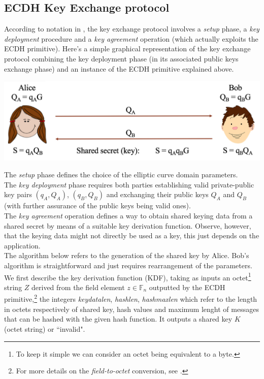 \subsection{ECDH Key Exchange protocol}
According to notation in \cite{Sec}, the key exchange protocol involves a \textit{setup} phase, a \textit{key deployment} procedure and a \textit{key agreement} operation (which actually exploits the ECDH primitive).
Here's a simple graphical representation of the key exchange protocol combining the key deployment phase (in its associated public keys exchange phase) and an instance of the ECDH primitive explained above.
\begin{center}
	\includegraphics[scale = 0.55]{Images/ECDH.png}
	\label{fig:ECDH}
\end{center}
The \textit{setup} phase defines the choice of the elliptic curve domain parameters.\\
The \textit{key deployment} phase requires both parties establishing valid private-public key pairs $(q_A,Q_A)$, $(q_B,Q_B)$ and exchanging their public keys $Q_A$ and $Q_B$ (with further assurance of the public keys being valid ones).\\
The \textit{key agreement} operation defines a way to obtain shared keying data from a shared secret by means of a suitable key derivation function. Observe, however, that the keying data might not directly be used as a key, this just depends on the application.\\ The algorithm below refers to the generation of the shared key by Alice. Bob's algorithm is straightforward and just requires rearrangement of the parameters. We first describe the key derivation function (KDF), taking as inputs an octet\footnote{To keep it simple we can consider an octet being equivalent to a byte.} string $Z$ derived from the field element $z \in \mathbb{F}_n$ outputted by the ECDH primitive,\footnote{For more details on the \textit{field-to-octet} conversion, see \cite{Sec}.} the integers \textit{keydatalen}, \textit{hashlen}, \textit{hashmaxlen} which refer to the length in octets respectively of shared key, hash values and maximum lenght of messages that can be hashed with the given hash function. It outputs a shared key $K$ (octet string) or ``invalid". 
